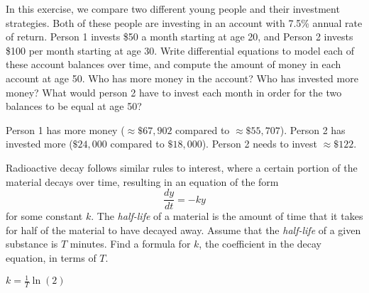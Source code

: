 \begin{exercise}
In this exercise, we compare two different young people and their investment strategies. Both of these people are investing in an account with 7.5\% annual rate of return. Person 1 invests \$50 a month starting at age 20, and Person 2 invests \$100 per month starting at age 30. Write differential equations to model each of these account balances over time, and compute the amount of money in each account at age 50. Who has more money in the account? Who has invested more money? What would person 2 have to invest each month in order for the two balances to be equal at age 50?
\end{exercise}
\comboSol{%
}
{%
Person 1 has more money ($\approx \$67,902$ compared to $\approx \$55,707$). Person 2 has invested more ($\$24,000$ compared to $\$18,000$). Person 2 needs to invest $\approx \$122$. 
}

\begin{exercise}
Radioactive decay follows similar rules to interest, where a certain portion of the material decays over time, resulting in an equation of the form 
\[ \frac{dy}{dt} = -ky \] for some constant $k$. The \emph{half-life} of a material is the amount of time that it takes for half of the material to have decayed away. Assume that the \emph{half-life} of a given substance is $T$ minutes. Find a formula for $k$, the coefficient in the decay equation, in terms of $T$.
\end{exercise}

\comboSol{%
}
{%
$k = \frac{1}{T}\ln(2)$
}


